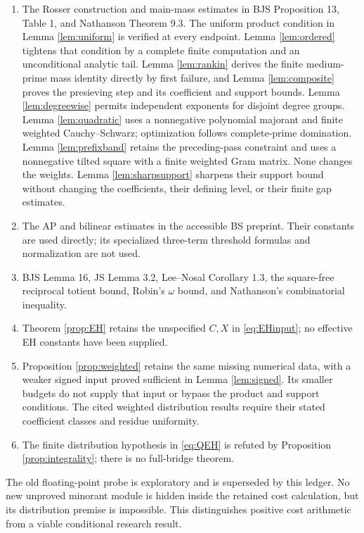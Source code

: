 \documentclass[11pt]{article}
\newcommand{\om}{\omega}
\begin{document}
\begin{enumerate}
\item The Rosser construction and main-mass estimates in BJS
Proposition 13, Table 1, and Nathanson Theorem 9.3. The uniform product
condition in Lemma \ref{lem:uniform} is verified at every endpoint.
Lemma \ref{lem:ordered} tightens that condition by a complete finite
computation and an unconditional analytic tail.
Lemma \ref{lem:rankin} derives the finite medium-prime mass identity
directly by first failure, and Lemma \ref{lem:composite} proves the
presieving step and its coefficient and support bounds.
Lemma \ref{lem:degreewise} permits independent exponents for disjoint
degree groups. Lemma \ref{lem:quadratic} uses a nonnegative polynomial
majorant and finite weighted Cauchy--Schwarz; optimization follows
complete-prime domination. Lemma \ref{lem:prefixband} retains the
preceding-pass constraint and uses a nonnegative tilted square with a
finite weighted Gram matrix. None changes the weights.
Lemma \ref{lem:sharpsupport} sharpens their support bound without changing
the coefficients, their defining level, or their finite gap estimates.
\item The AP and bilinear estimates in the accessible BS preprint.
Their constants are used directly; its specialized three-term
threshold formulas and normalization are not used.
\item BJS Lemma 16, JS Lemma 3.2, Lee--Nosal Corollary 1.3, the square-free reciprocal
totient bound, Robin's $\om$ bound, and Nathanson's combinatorial inequality.
\item Theorem \ref{prop:EH} retains the unspecified $C,X$ in
\eqref{eq:EHinput}; no effective EH constants have been supplied.
\item Proposition \ref{prop:weighted} retains the same missing numerical
data, with a weaker signed input proved sufficient in Lemma \ref{lem:signed}.
Its smaller budgets do not supply that input or bypass the product and
support conditions. The cited weighted distribution results require
their stated coefficient classes and residue uniformity.
\item The finite distribution hypothesis in \eqref{eq:QEH} is refuted
by Proposition \ref{prop:integrality}; there is no full-bridge theorem.
\end{enumerate}
The old floating-point probe is exploratory and is superseded by this
ledger. No new unproved minorant module is
hidden inside the retained cost calculation, but its distribution
premise is impossible. This distinguishes positive cost arithmetic
from a viable conditional research result.
\end{document}
